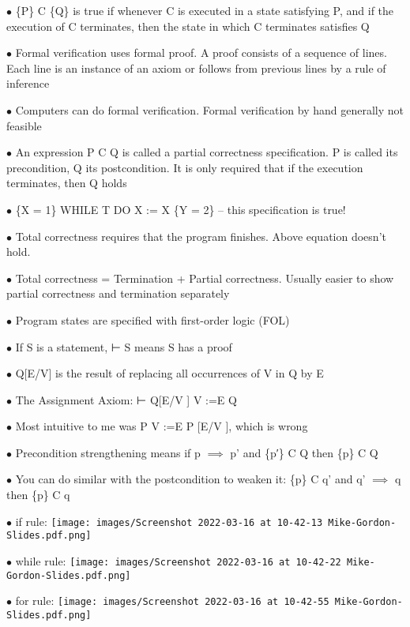 \documentclass[11pt]{article}
\begin{document}
\begin{compactenum}
\begin{minipage}{\minpagw}
{{      $\bullet$ \{P\} C \{Q\} is true if whenever C is executed in a state satisfying P, and if the execution of C terminates, then the state in which C terminates satisfies Q
      
      $\bullet$ Formal verification uses formal proof. A proof consists of a sequence of lines. Each line is an instance of an axiom or follows from previous lines by a rule of inference
      
      $\bullet$ Computers can do formal verification. Formal verification by hand generally not feasible
      
      $\bullet$ An expression {P } C {Q} is called a partial correctness specification. P is called its precondition, Q its postcondition. It is only required that if the execution terminates, then Q holds
      
      $\bullet$ \{X = 1\} WHILE T DO X := X \{Y = 2\} – this specification is true!
      
      $\bullet$ Total correctness requires that the program finishes. Above equation doesn't hold.
      
      $\bullet$ Total correctness = Termination + Partial correctness. Usually easier to show partial correctness and termination separately
      
      $\bullet$ Program states are specified with first-order logic (FOL)
      
      $\bullet$ If S is a statement, ⊢ S means S has a proof
      
      $\bullet$ Q[E/V] is the result of replacing all occurrences of V in Q by E
      
      $\bullet$ The Assignment Axiom: ⊢ {Q[E/V ]} V :=E {Q}
      
      $\bullet$ Most intuitive to me was {P } V :=E {P [E/V ]}, which is wrong
      
      $\bullet$ Precondition strengthening means if p $\implies$ p' and \{p′\} C {Q} then \{p\} C {Q}
      
      $\bullet$ You can do similar with the postcondition to weaken it: \{p\} C {q'} and q' $\implies$ q then \{p\} C {q}
      
      $\bullet$ if rule: \texttt{[image: images/Screenshot 2022-03-16 at 10-42-13 Mike-Gordon-Slides.pdf.png]}
      
      $\bullet$ while rule: \texttt{[image: images/Screenshot 2022-03-16 at 10-42-22 Mike-Gordon-Slides.pdf.png]}
      
      $\bullet$ for rule: \texttt{[image: images/Screenshot 2022-03-16 at 10-42-55 Mike-Gordon-Slides.pdf.png]}
      
}}
\end{minipage}
\end{compactenum}
\end{document}
